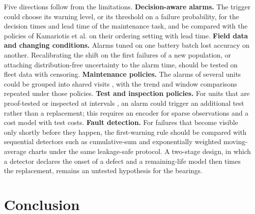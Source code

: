 \documentclass[a4paper,fleqn,doubleblind]{cas-dc}
\begin{document}
Five directions follow from the limitations. \textbf{Decision-aware alarms.} The trigger could choose its warning level, or its threshold on a failure probability, for the decision times and lead time of the maintenance task, and be compared with the policies of Kamariotis et al. \cite{kamariotis2024} on their ordering setting with lead time. \textbf{Field data and changing conditions.} Alarms tuned on one battery batch lost accuracy on another. Recalibrating the shift on the first failures of a new population, or attaching distribution-free uncertainty to the alarm time, should be tested on fleet data with censoring. \textbf{Maintenance policies.} The alarms of several units could be grouped into shared visits \cite{depater2022,mitici2023}, with the trend and window comparisons repeated under those policies. \textbf{Test and inspection policies.} For units that are proof-tested or inspected at intervals \cite{dejonge2020}, an alarm could trigger an additional test rather than a replacement; this requires an encoder for sparse observations and a cost model with test costs. \textbf{Fault detection.} For failures that become visible only shortly before they happen, the first-warning rule should be compared with sequential detectors such as cumulative-sum and exponentially weighted moving-average charts \cite{page1954,roberts1959} under the same leakage-safe protocol. A two-stage design, in which a detector declares the onset of a defect and a remaining-life model then times the replacement, remains an untested hypothesis for the bearings.

\section{Conclusion}\label{sec:10}
\end{document}
